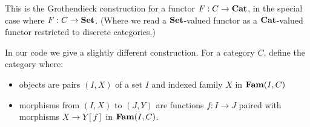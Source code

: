 \documentclass{acmart}
\begin{document}
\noindent This is the Grothendieck construction for a functor $F: C \to \mathbf{Cat}$, in the special case where $F: C
\to \mathbf{Set}$. (Where we read a $\mathbf{Set}$-valued functor as a $\mathbf{Cat}$-valued functor restricted to discrete
categories.)

In our code we give a slightly different construction. For a category $C$, define the category where:
\begin{itemize}
\item objects are pairs $(I, X)$ of a set $I$ and indexed family $X$ in $\mathbf{Fam}(I,C)$
\item morphisms from $(I, X)$ to $(J, Y)$ are functions $f: I \to J$ paired with morphisms $X \to Y[f]$ in
$\mathbf{Fam}(I,C)$.
\end{itemize}
\end{document}
